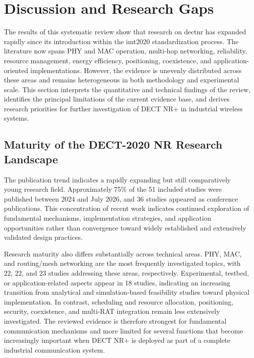 \section{Discussion and Research Gaps}
\label{sec:discussion}

The results of this systematic review show that research on \gls{dectnr} has expanded rapidly since its introduction within the \gls{imt2020} standardization process. The literature now spans PHY and MAC operation, multi-hop networking, reliability, resource management, energy efficiency, positioning, coexistence, and application-oriented implementations. However, the evidence is unevenly distributed across these areas and remains heterogeneous in both methodology and experimental scale. This section interprets the quantitative and technical findings of the review, identifies the principal limitations of the current evidence base, and derives research priorities for further investigation of DECT NR+ in industrial wireless systems.


\subsection{Maturity of the DECT-2020 NR Research Landscape}
\label{subsec:research_maturity}

The publication trend indicates a rapidly expanding but still comparatively young research field. Approximately 75\% of the 51 included studies were published between 2024 and July 2026, and 36 studies appeared as conference publications. This concentration of recent work indicates continued exploration of fundamental mechanisms, implementation strategies, and application opportunities rather than convergence toward widely established and extensively validated design practices.

Research maturity also differs substantially across technical areas. PHY, MAC, and routing/mesh networking are the most frequently investigated topics, with 22, 22, and 23 studies addressing these areas, respectively. Experimental, testbed, or application-related aspects appear in 18 studies, indicating an increasing transition from analytical and simulation-based feasibility studies toward physical implementation. In contrast, scheduling and resource allocation, positioning, security, coexistence, and multi-RAT integration remain less extensively investigated. The reviewed evidence is therefore strongest for fundamental communication mechanisms and more limited for several functions that become increasingly important when DECT NR+ is deployed as part of a complete industrial communication system.

